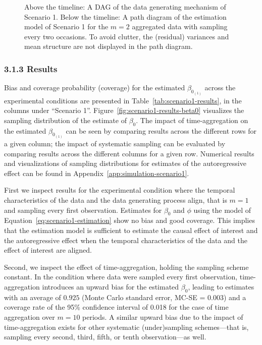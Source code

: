 \documentclass[man]{apa7} %
\begin{document}
\begin{figure}
    \vspace{1cm}
    \caption{Above the timeline: A DAG of the data generating mechanism of Scenario 1. Below the timeline: A path diagram of the estimation model of Scenario 1 for the $m = 2$ aggregated data with sampling every two occasions. To avoid clutter, the (residual) variances and mean structure are not displayed in the path diagram.}
    \label{fig:scenario1}
\end{figure}

\subsubsection{3.1.3 Results} 
Bias and coverage probability (coverage) for the estimated $\beta_{0_{(1)}}$  across the experimental conditions are presented in Table~\ref{tab:scenario1-results}, in the columns under ``Scenario 1''. Figure~\ref{fig:scenario1-results-beta0} visualizes the sampling distribution of the estimate of $\beta_{0}$. The impact of time-aggregation on the estimated $\beta_{0_{(1)}}$ can be seen by comparing results across the different rows for a given column; the impact of systematic sampling can be evaluated by comparing results across the different columns for a given row. Numerical results and visualizations of sampling distributions for estimates of the autoregressive effect can be found in Appendix~\ref{app:simulation-scenario1}.

First we inspect results for the experimental condition where the temporal characteristics of the data and the data generating process align, that is $m = 1$ and sampling every first observation. Estimates for $\beta_{0}$ and $\phi$ using the model of Equation~\ref{eq:scenario1-estimation} show no bias and good coverage. This implies that the estimation model is sufficient to estimate the causal effect of interest and the autoregressive effect when the temporal characteristics of the data and the effect of interest are aligned. 

Second, we inspect the effect of time-aggregation, holding the sampling scheme constant. In the condition where data were sampled every first observation, time-aggregation introduces an upward bias for the estimated $\beta_{0}$, leading to estimates with an average of $0.925$ (Monte Carlo standard error, MC-SE = 0.003) and a coverage rate of the 95\% confidence interval of 0.018 for the case of time aggregation over $m = 10$ periods. A similar upward bias due to the impact of time-aggregation exists for other systematic (under)sampling schemes---that is, sampling every second, third, fifth, or tenth observation---as well. 
\end{document}
